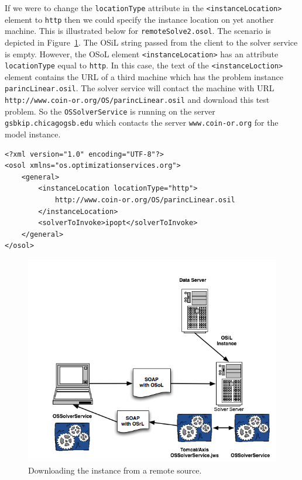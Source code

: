 \documentclass[11pt]{article}
\newcommand{\figurepath}{./figures}
\newcounter{Fig}
\renewcommand{\_}{{\char"5F}}
\renewcommand{\{}{{\char"7B}}
\renewcommand{\}}{{\char"7D}}
\renewcommand{\^}{{\char"0D}}
\renewcommand{\'}{{\char"0D}}
\newcommand{\UrlParinclinear}{http://www.coin-or.org/OS/parincLinear.osil}
\begin{document}
\begin{enumerate}[Step 1:]
If we were to change the {\tt locationType} attribute in the {\tt <instanceLocation>} element to {\tt http} then we
could specify the instance location on yet another machine. This is illustrated below  for {\tt remoteSolve2.osol}.
The scenario is depicted in Figure~\ref{figure:ossolverservice2}.  The OSiL string passed from the client to the solver
service is empty.  However, the OSoL element {\tt <instanceLocation>}  has an attribute {\tt locationType} equal to
{\tt http}.  In this case, the text of the {\tt <instanceLoction>} element contains the URL of a third machine which
has the problem instance {\tt parincLinear.osil}.  The solver service will contact the machine with URL
{\tt\UrlParinclinear} and download this test problem. So the {\tt OSSolverService} is
running on the server {\tt gsbkip.chicagogsb.edu} which contacts the server {\tt www.coin-or.org} for the model instance.
\begin{verbatim}
<?xml version="1.0" encoding="UTF-8"?>
<osol xmlns="os.optimizationservices.org">
    <general>
        <instanceLocation locationType="http">
            http://www.coin-or.org/OS/parincLinear.osil
        </instanceLocation>
        <solverToInvoke>ipopt</solverToInvoke>      
    </general>
</osol>
\end{verbatim}

\begin{figure}
\centering
\includegraphics[scale=0.5]{./figures/OSSolverService2.png}
\caption{Downloading the instance from a remote source.}
\label{figure:ossolverservice2}
\end{figure}


\end{enumerate}
\end{document}
